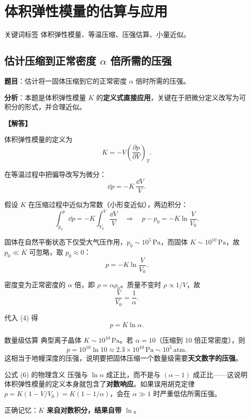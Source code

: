 \section{体积弹性模量的估算与应用}

\begin{tipbox}{关键词标签}
体积弹性模量、等温压缩、压强估算、小量近似。
\end{tipbox}

\subsection{估计压缩到正常密度 $\alpha$ 倍所需的压强}

\textbf{题目}：估计将一固体压缩到它的正常密度 $\alpha$ 倍时所需的压强。

\textbf{分析}：本题是体积弹性模量 $K$ 的\textbf{定义式直接应用}，关键在于把微分定义改写为可积分的形式，并合理近似。

\vspace{0.5em}
\textbf{【解答】}

体积弹性模量的定义为
\[
  K = -V\left(\frac{\partial p}{\partial V}\right)_T .
\tag{1}
\]

在等温过程中把偏导改写为微分：
\[
  \dd p = -K\,\frac{\dd V}{V} .
\tag{2}
\]

假设 $K$ 在压缩过程中近似为常数（小形变近似），两边积分：
\[
  \int_{p_0}^{p}\dd p = -K\int_{V_0}^{V}\frac{\dd V}{V}
  \quad\Longrightarrow\quad
  p - p_0 = -K\ln\frac{V}{V_0} .
\tag{3}
\]

固体在自然平衡状态下仅受大气压作用，$p_0 \sim 10^5\,\text{Pa}$，而固体 $K \sim 10^{10}\,\text{Pa}$，故 $p_0 \ll K$ 可忽略，取 $p_0 \approx 0$：
\[
  p = -K\ln\frac{V}{V_0} .
\tag{4}
\]

密度变为正常密度的 $\alpha$ 倍，即 $\rho = \alpha\rho_0$。质量不变时 $\rho \propto 1/V$，故
\[
  \frac{V}{V_0} = \frac{1}{\alpha} .
\tag{5}
\]

代入 (4) 得
\[
  \boxed{p = K\ln\alpha} .
\tag{6}
\]

\begin{insightbox}{数量级估算}
典型离子晶体 $K \sim 10^{10}\,\text{Pa}$。若 $\alpha = 10$（压缩到 10 倍正常密度），则
\[
  p = 10^{10}\ln 10 \approx 2.3\times 10^{10}\,\text{Pa} \sim 10^5\,\text{atm} .
\]
这相当于地幔深度的压强，说明要把固体压缩一个数量级需要\textbf{天文数字的压强}。
\end{insightbox}

\begin{modelbox}{公式 (6) 的物理含义}
压强与 $\ln\alpha$ 成正比，而不是与 $(\alpha-1)$ 成正比——这说明体积弹性模量的定义本身就包含了\textbf{对数响应}。如果误用胡克定律 $p = K(1-V/V_0) = K(1-1/\alpha)$，会在 $\alpha \gg 1$ 时严重低估所需压强。

正确记忆：\textbf{$K$ 来自对数积分，结果自带 $\ln$}。
\end{modelbox}



